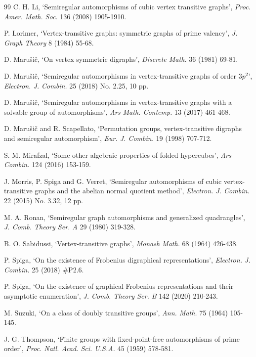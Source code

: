\documentclass[12pt,reqno]{amsart}
\numberwithin {equation} {section}
\begin{document}
\begin{thebibliography}{99}
{\sc C. H. Li}, `Semiregular automorphisms of cubic vertex transitive graphs', {\em Proc. Amer. Math. Soc.} 136 (2008) 1905-1910.

 {\sc  P. Lorimer},  `Vertex-transitive graphs: symmetric graphs of prime valency', {\em J. Graph Theory }8 (1984)  55-68.

 {\sc  D. Maru\v{s}i\v{c}},  `On vertex symmetric digraphs', {\em Discrete Math. }36 (1981) 69-81.

{\sc  D. Maru\v{s}i\v{c}}, `Semiregular automorphisms in vertex-transitive graphs of order $3p^2$', {\em Electron. J. Combin.} 25 (2018) No. 2.25, 10 pp.

{\sc  D. Maru\v{s}i\v{c}}, `Semiregular automorphisms in vertex-transitive graphs with a solvable group of automorphisms', {\em Ars Math. Contemp.} 13 (2017) 461-468.


 {\sc  D. Maru\v{s}i\v{c} } and {\sc R. Scapellato},  `Permutation groups, vertex-transitive digraphs and semiregular automorphism', {\em Eur. J. Combin. }19 (1998) 707-712.


 {\sc S. M. Mirafzal}, `Some other algebraic properties of folded hypercubes', {\em Ars Combin. }124 (2016)  153-159.

{\sc J. Morris, P. Spiga } and {\sc G. Verret}, `Semiregular automorphisms of cubic vertex-transitive graphs and the abelian normal quotient method', {\em Electron. J. Combin.} 22 (2015) No. 3.32, 12 pp.

 {\sc M. A. Ronan}, `Semiregular graph automorphisms and generalized quadrangles', {\em J. Comb. Theory Ser. A} 29 (1980) 319-328.

 {\sc B. O. Sabidussi}, `Vertex-transitive graphs', {\em Monash Math. }68 (1964) 426-438.


{\sc P. Spiga}, `On the existence of Frobenius digraphical representations', {\em Electron. J. Combin. }25 (2018)   \#P2.6.

{\sc P. Spiga}, `On the existence of graphical Frobenius representations and their asymptotic enumeration',  {\em J. Comb. Theory Ser. B }142 (2020) 210-243.

 {\sc M. Suzuki}, `On a class of doubly transitive groups',  {\em Ann. Math.  }75 (1964) 105-145.


{\sc J. G. Thompson}, `Finite groups with fixed-point-free automorphisms of prime order',
{\em Proc. Natl. Acad. Sci. U.S.A. }45 (1959) 578-581.


\end{thebibliography}
\end{document}
